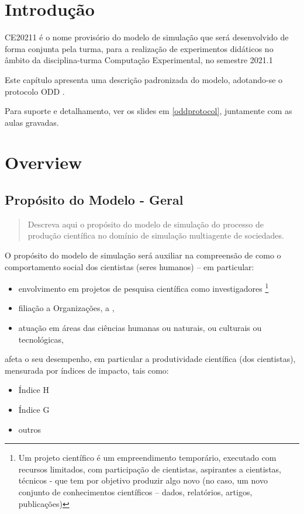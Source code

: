 
\section{Introdução}
CE20211 é o nome provisório do modelo de simulação que será desenvolvido de forma conjunta pela turma, para a realização de experimentos didáticos no âmbito da disciplina-turma Computação Experimental, no semestre 2021.1

Este capítulo apresenta uma descrição padronizada do modelo, adotando-se o protocolo ODD \citep{grimm_standard_2006}.

Para suporte e detalhamento, ver os slides em \ref{oddprotocol}, juntamente com as aulas gravadas.

\section{Overview}

\subsection{Propósito do Modelo - Geral}\label{sec:proposito}

\begin{quote}
    Descreva aqui o propósito do modelo de simulação do processo de produção científica no domínio de simulação multiagente de sociedades.
\end{quote}

O propósito do modelo de simulação será auxiliar na compreensão de como o comportamento social dos cientistas (seres humanos) – em particular:
\begin{itemize}
    \item 
envolvimento em projetos de pesquisa científica como investigadores \footnote{
Um projeto científico é um empreendimento temporário, executado com recursos limitados, com participação de cientistas, aspirantes a cientistas, técnicos - que tem por objetivo produzir algo novo (no caso, um novo conjunto de conhecimentos científicos – dados, relatórios, artigos, publicações)}
\item filiação a Organizações, a , 
\item atuação em áreas das ciências humanas ou naturais, ou culturais ou tecnológicas, 
\end{itemize}

afeta o seu desempenho, em particular a produtividade científica (dos cientistas), mensurada por índices de impacto, tais como:
\begin{itemize}
\item Índice H
\item Índice G
\item outros 
\end{itemize}


